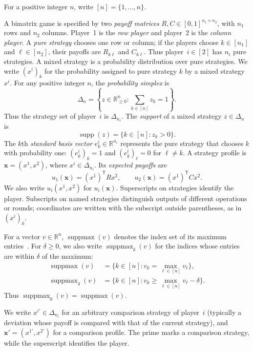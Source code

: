 \documentclass[11pt]{article}
\theoremstyle{remark}
\theoremstyle{plain}
\DeclareMathOperator{\supp}{supp}
\DeclareMathOperator{\suppmax}{suppmax}
\begin{document}
For a positive integer $n$, write $[n]=\{1,\ldots,n\}$.

A bimatrix game is specified by two \emph{payoff matrices}
$R,C\in[0,1]^{n_1\times n_2}$, with $n_1$ rows and $n_2$ columns.
Player~1 is the \emph{row player} and
player~2 is the \emph{column player}. A \emph{pure strategy} chooses one
row or column; if the players choose $k\in[n_1]$ and $\ell\in[n_2]$, their payoffs are
$R_{k\ell}$ and $C_{k\ell}$. Thus player~$i\in[2]$ has $n_i$ pure
strategies. A mixed strategy is a probability distribution
over pure strategies. We write $(x^i)_k$ for the probability assigned
to pure strategy $k$ by a mixed strategy $x^i$.
For any positive integer $n$, the \emph{probability simplex} is
\[
 \Delta_n=\left\{z\in\mathbb R_{\ge0}^{n}:
                 \sum_{k\in[n]}z_k=1\right\}.
\]
Thus the strategy set of player~$i$ is $\Delta_{n_i}$.
The \emph{support} of a mixed strategy $z\in\Delta_n$ is
\[
 \supp(z)=\{k\in[n]:z_k>0\}.
\]
The $k$th \emph{standard basis vector} $e_k^i\in\mathbb R^{n_i}$
represents the pure strategy that chooses $k$ with probability one:
$(e_k^i)_k=1$ and $(e_k^i)_\ell=0$ for $\ell\ne k$.
A strategy profile is
$\boldsymbol{x}=(x^1,x^2)$, where $x^i\in\Delta_{n_i}$. Its
\emph{expected payoffs} are
\[
 u_1(\boldsymbol{x})=(x^1)^{\mathsf T}Rx^2,
 \qquad
 u_2(\boldsymbol{x})=(x^1)^{\mathsf T}Cx^2.
\]
We also write $u_i(x^1,x^2)$ for $u_i(\boldsymbol{x})$.
Superscripts on strategies identify the player. Subscripts on named
strategies distinguish outputs of different operations or rounds;
coordinates are written with the subscript outside parentheses, as in
$(x^i)_k$.

For a vector $v\in\mathbb R^n$, $\suppmax(v)$ denotes the index set
of its maximum entries~\cite{tightness2023}. For $\delta\ge0$, we
also write $\suppmax_\delta(v)$ for the indices whose entries are
within $\delta$ of the maximum:
\[
 \begin{aligned}
  \suppmax(v)&=\{k\in[n]:v_k=\max_{\ell\in[n]}v_\ell\},\\
  \suppmax_\delta(v)&=\{k\in[n]:v_k\ge\max_{\ell\in[n]}v_\ell-\delta\}.
 \end{aligned}
\]
Thus $\suppmax_0(v)=\suppmax(v)$.

We write $x^{i\prime}\in\Delta_{n_i}$ for an arbitrary comparison
strategy of player~$i$ (typically a deviation whose payoff is compared
with that of the current strategy), and
$\boldsymbol{x}'=(x^{1\prime},x^{2\prime})$ for a comparison profile.
The prime marks a comparison strategy, while the superscript identifies
the player.
\end{document}
